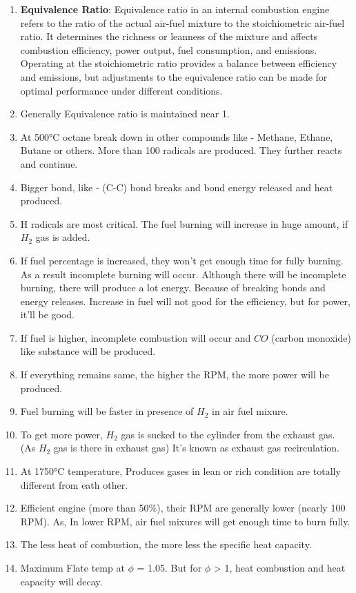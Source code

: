 \documentclass{article}
\begin{document}
\begin{enumerate}
  \item \textbf{Equivalence Ratio}: Equivalence ratio in an internal combustion engine refers to the ratio of the actual air-fuel mixture to the stoichiometric air-fuel ratio. It determines the richness or leanness of the mixture and affects combustion efficiency, power output, fuel consumption, and emissions. Operating at the stoichiometric ratio provides a balance between efficiency and emissions, but adjustments to the equivalence ratio can be made for optimal performance under different conditions. 
  \item Generally Equivalence ratio is maintained near 1. 
  \item At 500°C octane break down in other compounds like - Methane, Ethane, Butane or others. More than 100 radicals are produced. They further reacts and continue. 
  \item Bigger bond, like - (C-C) bond breaks and bond energy released and heat produced.
  \item H radicals are most critical. The fuel burning will increase in huge amount, if $H_2$ gas is added. 
  \item If fuel percentage is increased, they won't get enough time for fully burning. As a result incomplete burning will occur. Although there will be incomplete burning, there will produce a lot energy. Because of breaking bonds and energy releases. Increase in fuel will not good for the efficiency, but for power, it'll be good. 
  \item If fuel is higher, incomplete combustion will occur and $CO$ (carbon monoxide) like substance will be produced. 
  \item If everything remains same, the higher the RPM, the more power will be produced. 
  \item Fuel burning will be faster in presence of $H_2$ in air fuel mixure. 
  \item To get more power, $H_2$ gas is sucked to the cylinder from the exhaust gas. (As $H_2$ gas is there in exhaust gas) It's known as exhaust gas recirculation. 
  \item At 1750°C temperature, Produces gases in lean or rich condition are  totally different from eath other.
  \item Efficient engine (more than 50\%), their RPM are generally lower (nearly 100 RPM). As, In lower RPM, air fuel mixures will get enough time to burn fully.
  \item The less heat of combustion, the more less the specific heat capacity. 
  \item Maximum Flate temp at $\phi$ = 1.05. But for $\phi$ > 1, heat combustion and heat capacity will decay. 
\end{enumerate}
\end{document}
